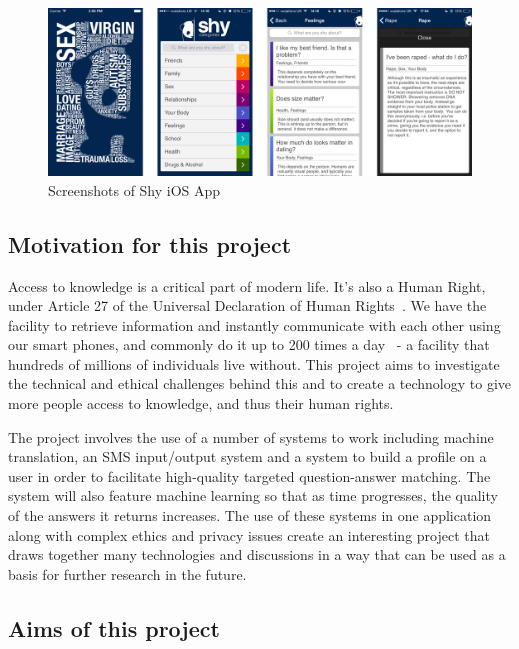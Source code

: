 \documentclass{article}
\begin{document}

\begin{figure}[htb] 
\includegraphics[width=\linewidth]{shy-screenshots}
\caption{Screenshots of Shy iOS App}
\label{fig:shy-ios-screenshots}
\end{figure}

\subsection{Motivation for this project}
Access to knowledge is a critical part of modern life.  It's also a Human Right, under Article 27 of the Universal Declaration of Human Rights~\cite{community1948universal}.  We have the facility to retrieve information and instantly communicate with each other using our smart phones, and commonly do it up to 200 times a day~\cite{falaki} - a facility that hundreds of millions of individuals live without.  This project aims to investigate the technical and ethical challenges behind this and to create a technology to give more people access to knowledge, and thus their human rights.

The project involves the use of a number of systems to work including machine translation, an SMS input/output system and a system to build a profile on a user in order to facilitate high-quality targeted question-answer matching.  The system will also feature machine learning so that as time progresses, the quality of the answers it returns increases.  The use of these systems in one application along with complex ethics and privacy issues create an interesting project that draws together many technologies and discussions in a way that can be used as a basis for further research in the future.

\subsection{Aims of this project}
\end{document}
